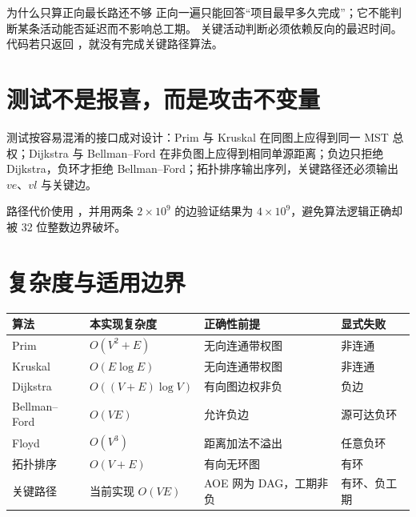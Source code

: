 \documentclass[UTF8,fontset=none,11pt,a4paper]{ctexart}
\begin{document}
\begin{corebox}{为什么只算正向最长路还不够}
正向一遍只能回答“项目最早多久完成”；它不能判断某条活动能否延迟而不影响总工期。
关键活动判断必须依赖反向的最迟时间。代码若只返回 ，就没有完成关键路径算法。
\end{corebox}



\section{测试不是报喜，而是攻击不变量}



测试按容易混淆的接口成对设计：Prim 与 Kruskal 在同图上应得到同一 MST 总权；Dijkstra 与 Bellman--Ford 在非负图上应得到相同单源距离；负边只拒绝 Dijkstra，负环才拒绝 Bellman--Ford；拓扑排序输出序列，关键路径还必须输出 $ve$、$vl$ 与关键边。

路径代价使用 ，并用两条 $2\times10^9$ 的边验证结果为 $4\times10^9$，避免算法逻辑正确却被 32 位整数边界破坏。

\section{复杂度与适用边界}

\begin{center}\small
\begin{tabularx}{\linewidth}{L{2.3cm}C{2.4cm}Y Y}
\toprule
算法 & 本实现复杂度 & 正确性前提 & 显式失败 \\
\midrule
Prim & $O(V^2+E)$ & 无向连通带权图 & 非连通 \\
Kruskal & $O(E\log E)$ & 无向连通带权图 & 非连通 \\
Dijkstra & $O((V+E)\log V)$ & 有向图边权非负 & 负边 \\
Bellman--Ford & $O(VE)$ & 允许负边 & 源可达负环 \\
Floyd & $O(V^3)$ & 距离加法不溢出 & 任意负环 \\
拓扑排序 & $O(V+E)$ & 有向无环图 & 有环 \\
关键路径 & 当前实现 $O(VE)$ & AOE 网为 DAG，工期非负 & 有环、负工期 \\
\bottomrule
\end{tabularx}
\end{center}
\end{document}
